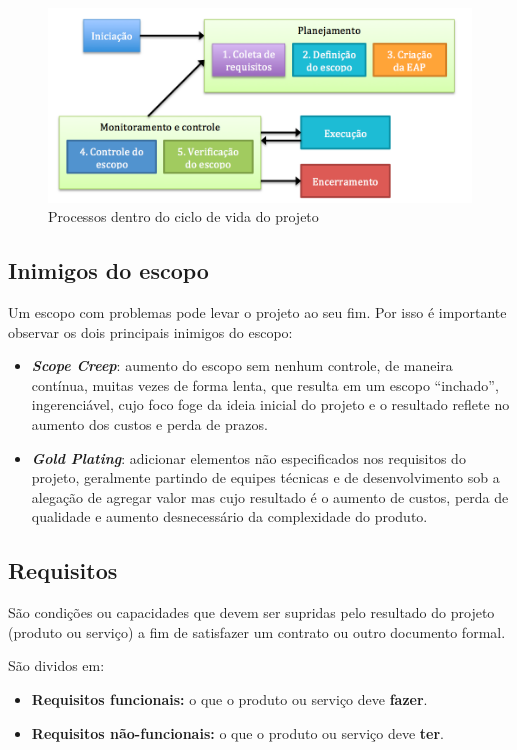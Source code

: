 \begin{figure}[!h]
\centering
\includegraphics[scale=0.5]{Figuras/ciclo_vida.png}
\caption{Processos dentro do ciclo de vida do projeto}
\label{fig:ciclo:vida}
\end{figure}

\subsection{Inimigos do escopo}

Um escopo com problemas pode levar o projeto ao seu fim. Por isso é importante observar os dois principais inimigos do escopo:

\begin{itemize}

\item \textbf{\textit{Scope Creep}}: aumento do escopo sem nenhum controle, de maneira contínua, muitas vezes de forma lenta, que resulta em um escopo ``inchado'', ingerenciável, cujo foco foge da ideia inicial do projeto e o resultado reflete no aumento dos custos e perda de prazos.

\item \textbf{\textit{Gold Plating}}: adicionar elementos não especificados nos requisitos do projeto, geralmente partindo de equipes técnicas e de desenvolvimento sob a alegação de agregar valor mas cujo resultado é o aumento de custos, perda de qualidade e aumento desnecessário da complexidade do produto.

\end{itemize}

\subsection{Requisitos}

São condições ou capacidades que devem ser supridas pelo resultado do projeto (produto ou serviço) a fim de satisfazer um contrato ou outro documento formal.

São dividos em:

\begin{itemize}

\item \textbf{Requisitos funcionais:} o que o produto ou serviço deve \textbf{fazer}.

\item \textbf{Requisitos não-funcionais:} o que o produto ou serviço deve \textbf{ter}.

\end{itemize}
